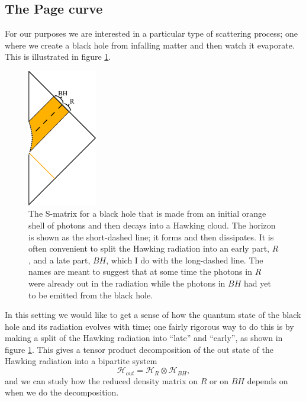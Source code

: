 \documentclass[12pt]{article}
\newcommand{\be}{\begin{equation}}
\newcommand{\ee}{\end{equation}}
\begin{document}
\subsection{The Page curve}\label{pcurvesec}
For our purposes we are interested in a particular type of scattering process; one where we create a black hole from infalling matter and then watch it evaporate.  This is illustrated in figure \ref{bhscat}.
\begin{figure}
\begin{center}
\includegraphics[height=6cm]{bhscat.pdf}
\caption{The S-matrix for a black hole that is made from an initial orange shell of photons and then decays into a Hawking cloud.  The horizon is shown as the short-dashed line; it forms and then dissipates.  It is often convenient to split the Hawking radiation into an early part, $R$, and a late part, $BH$, which I do with the long-dashed line.  The names are meant to suggest that at some time the photons in $R$ were already out in the radiation while the photons in $BH$ had yet to be emitted from the black hole.}\label{bhscat}
\end{center}
\end{figure}

In this setting we would like to get a sense of how the quantum state of the black hole and its radiation evolves with time; one fairly rigorous way to do this is by making a split of the Hawking radiation into ``late'' and ``early'', as shown in figure \ref{bhscat}.  This gives a tensor product decomposition of the out state of the Hawking radiation into a bipartite system
\be
\mathcal{H}_{out}=\mathcal{H}_R\otimes \mathcal{H}_{BH},
\ee 
and we can study how the reduced density matrix on $R$ or on $BH$ depends on when we do the decomposition.   
\end{document}
